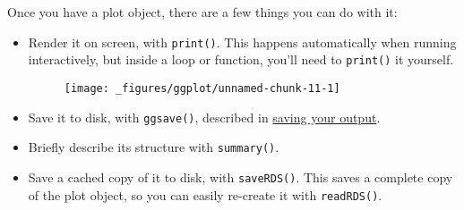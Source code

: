 Once you have a plot object, there are a few things you can do with it:

\begin{itemize}
\item
  Render it on screen, with \texttt{print()}. This happens automatically
  when running interactively, but inside a loop or function, you'll need
  to \texttt{print()} it yourself. 

\begin{Shaded}
\begin{Highlighting}[]
\end{Highlighting}
\end{Shaded}

  \begin{figure}[H]
    \centering
    \texttt{[image: \_figures/ggplot/unnamed-chunk-11-1]}
  \end{figure}
\item
  Save it to disk, with \texttt{ggsave()}, described in
  \hyperref[sec:saving]{saving your output}.

\begin{Shaded}
\begin{Highlighting}[]
\NormalTok{(}\NormalTok{, } \NormalTok{, } \NormalTok{)}
\end{Highlighting}
\end{Shaded}
\item
  Briefly describe its structure with \texttt{summary()}.

\begin{Shaded}
\begin{Highlighting}[]
\CommentTok{#> -----------------------------------}
\end{Highlighting}
\end{Shaded}
\item
  Save a cached copy of it to disk, with \texttt{saveRDS()}. This saves
  a complete copy of the plot object, so you can easily re-create it
  with \texttt{readRDS()}.  

\begin{Shaded}
\begin{Highlighting}[]
\NormalTok{)}
\StringTok{ }\NormalTok{(}\NormalTok{)}
\end{Highlighting}
\end{Shaded}
\end{itemize}

